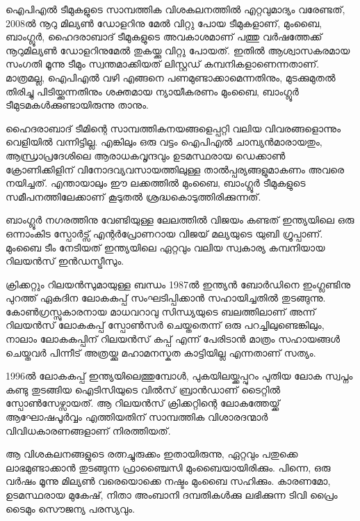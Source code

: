 \vskip 1pt

ഐപിഎല്‍ ടീമുകളുടെ സാമ്പത്തിക വിശകലനത്തില്‍ എറ്റവുമാദ്യം വരേണ്ടത്, 2008ല്‍ നൂറു മില്യണ്‍ ഡോളറിനു മേല്‍ 
വിറ്റു പോയ ടീമുകളാണ്, മുംബൈ, ബാംഗ്ലൂര്‍, ഹൈദരാബാദ് ടീമുകളുടെ അവകാശമാണ് പത്തു വര്‍ഷത്തേക്ക് 
നൂറുമില്യണ്‍ ഡോളറിനുമേല്‍ തുകയ്ക്കു വിറ്റു പോയത്. ഇതില്‍ ആശ്വാസകരമായ സംഗതി മൂന്നു ടീമും സ്വന്തമാക്കിയത് 
ലിസ്റ്റഡ് കമ്പനികളാണെന്നതാണ്. മാത്രമല്ല, ഐപിഎല്‍ വഴി എങ്ങനെ പണമുണ്ടാക്കാമെന്നതിനും, മുടക്കുമുതല്‍ തിരിച്ചു 
പിടിയ്ക്കുന്നതിനും ശക്തമായ ന്യായീകരണം മുംബൈ, ബാംഗ്ലൂര്‍ ടീമുടമകള്‍ക്കുണ്ടായിരുന്നു താനും.

ഹൈദരാബാദ് ടീമിന്റെ സാമ്പത്തികനയങ്ങളെപ്പറ്റി വലിയ വിവരങ്ങളൊന്നും വെളിയില്‍ വന്നിട്ടില്ല. എങ്കിലും ഒരു വട്ടം 
ഐപിഎല്‍ ചാമ്പ്യന്‍മാരായതും, ആന്ധ്രാപ്രദേശിലെ ആരാധകവൃന്ദവും ഉടമസ്ഥരായ ഡെക്കാണ്‍ ക്രോണിക്കിളിന് 
വിനോദവ്യവസായത്തിലുള്ള താല്‍പ്പര്യങ്ങളുമാകണം അവരെ നയിച്ചത്. എന്തായാലും ഈ ലക്കത്തില്‍ മുംബൈ, 
ബാംഗ്ലൂര്‍ ടീമുകളുടെ സമീപനത്തിലേക്കാണ് കൂടുതല്‍ ശ്രദ്ധകൊടുത്തിരിക്കുന്നത്.

ബാംഗ്ലൂര്‍ നഗരത്തിനു വേണ്ടിയുള്ള ലേലത്തില്‍ വിജയം കണ്ടത് ഇന്ത്യയിലെ ഒരു ഒന്നാംകിട സ്പോര്‍ട്സ് എന്റര്‍പ്രോണറായ 
വിജയ് മല്യയുടെ യുബി ഗ്രൂപ്പാണ്. മുംബൈ ടീം നേടിയത് ഇന്ത്യയിലെ ഏറ്റവും വലിയ സ്വകാര്യ കമ്പനിയായ റിലയന്‍സ് 
ഇന്‍ഡസ്ട്രീസും.


ക്രിക്കറ്റും റിലയന്‍സുമായുള്ള ബന്ധം 1987ല്‍ ഇന്ത്യന്‍ ബോര്‍ഡിനെ ഇംഗ്ലണ്ടിനു പുറത്ത് ഏകദിന ലോകകപ്പ് 
സംഘടിപ്പിക്കാന്‍ സഹായിച്ചതില്‍ തുടങ്ങുന്നു. കോണ്‍ഗ്രസ്സുകാരനായ മാധവറാവു സിന്ധ്യയുടെ ബലത്തിലാണ് 
അന്ന് റിലയന്‍സ് ലോകകപ്പ് സ്പോണ്‍സര്‍ ചെയ്തതെന്ന് ഒരു പറച്ചിലുണ്ടെങ്കിലും, നാലാം ലോകകപ്പിന് റിലയന്‍സ് 
കപ്പ് എന്ന് പേരിടാന്‍ മാത്രം സഹായങ്ങള്‍ ചെയ്തവര്‍ പിന്നീട് അത്രയ്ക്കു മഹാമനസ്കത കാട്ടിയില്ല എന്നതാണ് സത്യം.

1996ല്‍ ലോകകപ്പ് ഇന്ത്യയിലെത്തുമ്പോള്‍, പുകയിലയ്ക്കപ്പുറം പുതിയ ലോക സ്വപ്നം കണ്ടു തുടങ്ങിയ ഐടിസിയുടെ 
വില്‍സ് ബ്രാന്‍ഡാണ് ടൈറ്റില്‍ സ്പോണ്‍സേഴ്സായത്. ആ റിലയന്‍സ് ക്രിക്കറ്റിന്റെ ലോകത്തേയ്ക്ക് ആഘോഷപൂര്‍‌വ്വം 
എത്തിയതിന് സാമ്പത്തിക വിശാരദന്മാര്‍ വിവിധകാരണങ്ങളാണ് നിരത്തിയത്.

ആ വിശകലനങ്ങളുടെ രത്നച്ചുരുക്കം ഇതായിരുന്നു, ഏറ്റവും പതുക്കെ ലാഭമുണ്ടാക്കാന്‍ തുടങ്ങുന്ന ഫ്രാഞ്ചൈസി 
മുംബൈയായിരിക്കും. പിന്നെ, ഒരു വര്‍ഷം മൂന്നു മില്യണ്‍ വരെയൊക്കെ നഷ്ടം മുംബൈ സഹിക്കും. കാരണമോ, 
ഉടമസ്ഥരായ മുകേഷ്, നിതാ അംബാനി ദമ്പതികള്‍ക്കു ലഭിക്കുന്ന ടിവി പ്രൈം ടൈമും സൌജന്യ പരസ്യവും.


